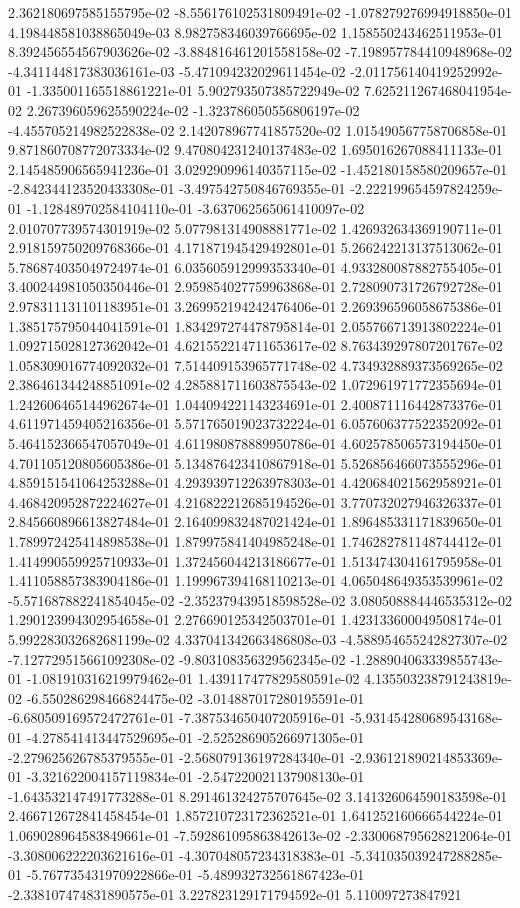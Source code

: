 2.362180697585155795e-02	-8.556176102531809491e-02	-1.078279276994918850e-01	4.198448581038865049e-03	8.982758346039766695e-02	1.158550243462511953e-01	8.392456554567903626e-02	-3.884816461201558158e-02	-7.198957784410948968e-02	-4.341144817383036161e-03	-5.471094232029611454e-02	-2.011756140419252992e-01	-1.335001165518861221e-01	5.902793507385722949e-02	7.625211267468041954e-02	2.267396059625590224e-02	-1.323786050556806197e-02	-4.455705214982522838e-02	2.142078967741857520e-02	1.015490567758706858e-01	9.871860708772073334e-02	9.470804231240137483e-02	1.695016267088411133e-01	2.145485906565941236e-01	3.029290996140357115e-02	-1.452180158580209657e-01	-2.842344123520433308e-01	-3.497542750846769355e-01	-2.222199654597824259e-01	-1.128489702584104110e-01	-3.637062565061410097e-02	2.010707739574301919e-02	5.077981314908881771e-02	1.426932634369190711e-01	2.918159750209768366e-01	4.171871945429492801e-01	5.266242213137513062e-01	5.786874035049724974e-01	6.035605912999353340e-01	4.933280087882755405e-01	3.400244981050350446e-01	2.959854027759963868e-01	2.728090731726792728e-01	2.978311131101183951e-01	3.269952194242476406e-01	2.269396596058675386e-01	1.385175795044041591e-01	1.834297274478795814e-01	2.055766713913802224e-01	1.092715028127362042e-01	4.621552214711653617e-02	8.763439297807201767e-02	1.058309016774092032e-01	7.514409153965771748e-02	4.734932889373569265e-02	2.386461344248851091e-02	4.285881711603875543e-02	1.072961971772355694e-01	1.242606465144962674e-01	1.044094221143234691e-01	2.400871116442873376e-01	4.611971459405216356e-01	5.571765019023732224e-01	6.057606377522352092e-01	5.464152366547057049e-01	4.611980878889950786e-01	4.602578506573194450e-01	4.701105120805605386e-01	5.134876423410867918e-01	5.526856466073555296e-01	4.859151541064253288e-01	4.293939712263978303e-01	4.420684021562958921e-01	4.468420952872224627e-01	4.216822212685194526e-01	3.770732027946326337e-01	2.845660896613827484e-01	2.164099832487021424e-01	1.896485331171839650e-01	1.789972425414898538e-01	1.879975841404985248e-01	1.746282781148744412e-01	1.414990559925710933e-01	1.372456044213186677e-01	1.513474304161795958e-01	1.411058857383904186e-01	1.199967394168110213e-01	4.065048649353539961e-02	-5.571687882241854045e-02	-2.352379439518598528e-02	3.080508884446535312e-02	1.290123994302954658e-01	2.276690125342503701e-01	1.423133600049508174e-01	5.992283032682681199e-02	4.337041342663486808e-03	-4.588954655242827307e-02	-7.127729515661092308e-02	-9.803108356329562345e-02	-1.288904063339855743e-01	-1.081910316219979462e-01	1.439117477829580591e-02	4.135503238791243819e-02	-6.550286298466824475e-02	-3.014887017280195591e-01	-6.680509169572472761e-01	-7.387534650407205916e-01	-5.931454280689543168e-01	-4.278541413447529695e-01	-2.525286905266971305e-01	-2.279625626785379555e-01	-2.568079136197284340e-01	-2.936121890214853369e-01	-3.321622004157119834e-01	-2.547220021137908130e-01	-1.643532147491773288e-01	8.291461324275707645e-02	3.141326064590183598e-01	2.466712672841458454e-01	1.857210723172362521e-01	1.641252160666544224e-01	1.069028964583849661e-01	-7.592861095863842613e-02	-2.330068795628212064e-01	-3.308006222203621616e-01	-4.307048057234318383e-01	-5.341035039247288285e-01	-5.767735431970922866e-01	-5.489932732561867423e-01	-2.338107474831890575e-01	3.227823129171794592e-01	5.110097273847921